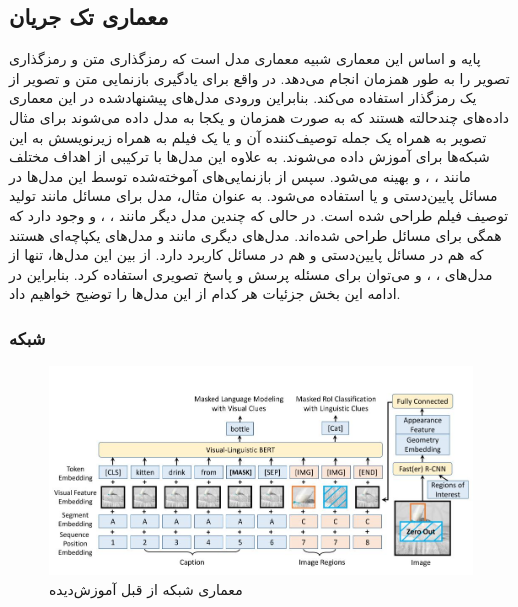\subsection[معماری تک جریان]{معماری تک جریان}
	پایه و اساس این معماری شبیه معماری مدل 
	\cite{devlin2018bert}
	است که رمزگذاری متن
	و رمزگذاری تصویر 
	را به طور همزمان انجام می‌دهد. در واقع برای یادگیری بازنمایی متن و تصویر از یک  رمزگذار
	استفاده می‌کند. بنابراین ورودی مدل‌های پیشنهادشده در این معماری داده‌های چندحالته
	هستند که به صورت همزمان و یکجا به مدل داده می‌شوند برای مثال تصویر به همراه یک جمله توصیف‌کننده آن و یا یک فیلم به همراه زیرنویسش به این شبکه‌ها برای آموزش داده می‌شوند. به علاوه این مدل‌ها با ترکیبی از اهداف مختلف مانند 
	،
	،
	و 
   بهینه می‌شود. سپس از بازنمایی‌های آموخته‌شده توسط این مدل‌ها در مسائل پایین‌دستی 
   و یا 
   استفاده می‌شود. به عنوان مثال، مدل
	\cite{sun2019videobert}
	برای مسائل 
	مانند تولید توصیف فیلم طراحی شده است. در حالی که چندین مدل دیگر مانند
	\cite{alberti2019fusion}
	،
	 \cite{li2020unicoder}
	،
	\cite{su2019vl}
	و
	\cite{chen2020uniter}
	وجود دارد که همگی برای مسائل 
    طراحی شده‌اند. مدل‌های دیگری مانند
	\cite{zhou2020unified}
	و
	 \cite{li2020oscar}
	مدل‌های یکپاچه‌ای هستند که هم در مسائل پایین‌دستی 
	و هم در مسائل
	کاربرد دارد. از بین این مدل‌ها، تنها از مدل‌های
	،
	،
	و
	می‌توان برای مسئله پرسش و پاسخ تصویری استفاده کرد. بنابراین در ادامه این بخش جزئیات هر کدام از این مدل‌ها را توضیح خواهیم داد.
	
\subsubsection{  شبکه }
	\begin{figure}
		\centerline{\includegraphics[scale=0.5]{images/VLBERT.JPG}}
		\caption[معماری شبکه از قبل آموزش‌دیده ]{معماری شبکه از قبل آموزش‌دیده\cite{su2019vl}}
		\label{fig:VLBERT}
	\end{figure}

